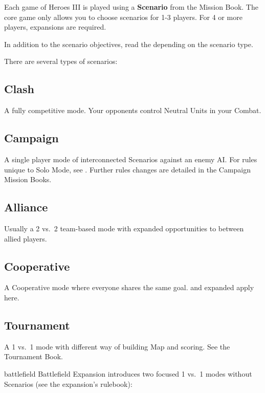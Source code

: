 
\begin{multicols*}{2}

Each game of Heroes III is played using a \textbf{Scenario} from the Mission Book.
The core game only allows you to choose scenarios for 1-3 players. For 4 or more players, expansions are required.\par
In addition to the scenario objectives, read the  depending on the scenario type.\par
There are several types of scenarios:

\subsection*{Clash}
A fully competitive mode.
Your opponents control Neutral Units in your Combat.

\subsection*{Campaign}
A single player mode of interconnected Scenarios against an enemy AI.
For rules unique to Solo Mode, see .
Further rules changes are detailed in the Campaign Mission Books.

\subsection*{Alliance}
Usually a 2 vs.~2 team-based mode with expanded opportunities to  between allied players.

\subsection*{Cooperative}
A Cooperative mode where everyone shares the same goal.  and expanded  apply here.

\subsection*{Tournament}
A 1 vs.~1 mode with different way of building Map and scoring. See the Tournament Book.

\columnbreak

\begin{expansion}{battlefield}
Battlefield Expansion introduces two focused 1 vs.~1 modes without Scenarios (see the expansion's rulebook):


\end{expansion}
\end{multicols*}
